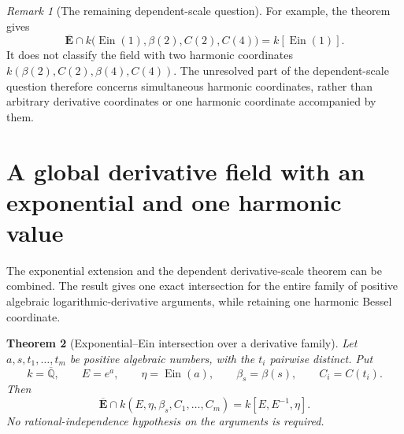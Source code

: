 \documentclass[11pt]{article}
\newtheorem{theorem}{Theorem}[section]
\theoremstyle{definition}
\theoremstyle{remark}
\newtheorem{remark}[theorem]{Remark}
\newcommand{\Ebar}{\overline{\mathbf E}}
\newcommand{\Ein}{\operatorname{Ein}}
\begin{document}
\begin{remark}[The remaining dependent-scale question]
For example, the theorem gives
\[
 \Ebar\cap k\bigl(\Ein(1),\beta(2),C(2),C(4)\bigr)=k[\Ein(1)].
\]
It does not classify the field with two harmonic coordinates
$k(\beta(2),C(2),\beta(4),C(4))$. The unresolved part of the
dependent-scale question therefore concerns simultaneous harmonic
coordinates, rather than arbitrary derivative coordinates or one
harmonic coordinate accompanied by them.
\end{remark}


\section{A global derivative field with an exponential and one harmonic value}
\label{gde:section}

The exponential extension and the dependent derivative-scale theorem
can be combined.  The result gives one exact intersection for the
entire family of positive algebraic logarithmic-derivative arguments,
while retaining one harmonic Bessel coordinate.

\begin{theorem}[Exponential--Ein intersection over a derivative family]
\label{gde:main}
Let $a,s,t_1,\ldots,t_m$ be positive algebraic numbers, with the $t_i$
pairwise distinct.  Put
\[
 k=\overline{\mathbb Q},\qquad E=e^a,\qquad
 \eta=\Ein(a),\qquad \beta_s=\beta(s),\qquad C_i=C(t_i).
\]
Then
\begin{equation}\label{gde:intersection}
 \boxed{\quad
 \overline{\mathbf E}\cap
 k(E,\eta,\beta_s,C_1,\ldots,C_m)
       =k[E,E^{-1},\eta].
 \quad}
\end{equation}
No rational-independence hypothesis on the arguments is required.
\end{theorem}
\end{document}
